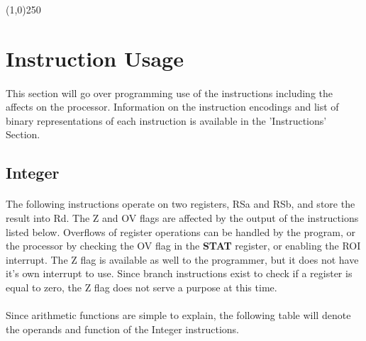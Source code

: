 \documentclass[letterpaper, 11pt]{article}
\begin{document}
\begin{center}
	\line(1,0){250}
\end{center}

\clearpage
\section{Instruction Usage}
\paragraph{}This section will go over programming use of the instructions including the affects on the processor. Information on the 
instruction encodings and list of binary representations of each instruction is available in the 'Instructions' Section.
\subsection{Integer}
\paragraph{} The following instructions operate on two registers, RSa and RSb, and store the result into Rd. The Z and OV flags are affected
by the output of the instructions listed below. Overflows of register operations can be handled by the program, or the processor by checking the
OV flag in the \textbf{STAT} register, or enabling the ROI interrupt. The Z flag is available as well to the programmer, but it does not have
it's own interrupt to use. Since branch instructions exist to check if a register is equal to zero, the Z flag does not serve a purpose at this time.
\paragraph{} Since arithmetic functions are simple to explain, the following table will denote the operands and function of the Integer instructions. 
\end{document}
